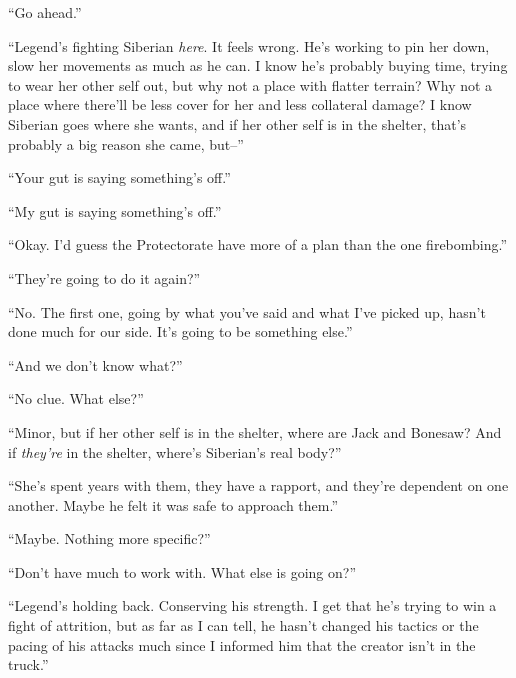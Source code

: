``Go ahead.''



``Legend's fighting Siberian \emph{here}.  It feels wrong.  He's working to pin her down, slow her movements as much as he can.  I know he's probably buying time, trying to wear her other self out, but why not a place with flatter terrain?  Why not a place where there'll be less cover for her and less collateral damage?  I know Siberian goes where she wants, and if her other self is in the shelter, that's probably a big reason she came, but--''



``Your gut is saying something's off.''



``My gut is saying something's off.''



``Okay.  I'd guess the Protectorate have more of a plan than the one firebombing.''



``They're going to do it again?''



``No.  The first one, going by what you've said and what I've picked up, hasn't done much for our side.  It's going to be something else.''



``And we don't know what?''



``No clue.  What else?''



``Minor, but if her other self is in the shelter, where are Jack and Bonesaw?  And if \emph{they're }in the shelter, where's Siberian's real body?''



``She's spent years with them, they have a rapport, and they're dependent on one another. Maybe he felt it was safe to approach them.''



``Maybe.  Nothing more specific?''



``Don't have much to work with.  What else is going on?''



``Legend's holding back.  Conserving his strength.  I get that he's trying to win a fight of attrition, but as far as I can tell, he hasn't changed his tactics or the pacing of his attacks much since I informed him that the creator isn't in the truck.''



